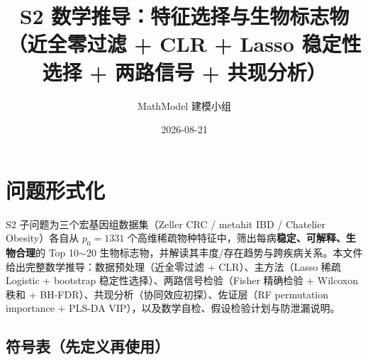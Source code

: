 \documentclass{internal-report}
\title{S2 数学推导：特征选择与生物标志物（近全零过滤 + CLR + Lasso 稳定性选择 + 两路信号 + 共现分析）}
\author{MathModel 建模小组}
\date{2026-08-21}
\begin{document}
\maketitle

\section{问题形式化}

S2 子问题为三个宏基因组数据集（Zeller CRC / metahit IBD / Chatelier Obesity）各自从 $p_0=1331$ 个高维稀疏物种特征中，筛出每病\textbf{稳定、可解释、生物合理}的 Top 10$\sim$20 生物标志物，并解读其丰度/存在趋势与跨疾病关系。本文件给出完整数学推导：数据预处理（近全零过滤 + CLR）、主方法（Lasso 稀疏 Logistic + bootstrap 稳定性选择）、两路信号检验（Fisher 精确检验 + Wilcoxon 秩和 + BH-FDR）、共现分析（协同效应初探）、佐证层（RF permutation importance + PLS-DA VIP），以及数学自检、假设检验计划与防泄漏说明。

\subsection{符号表（先定义再使用）}
\end{document}
